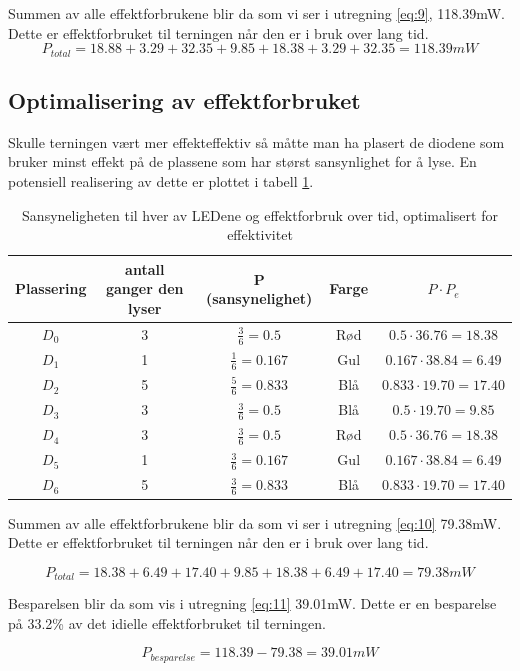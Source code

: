 Summen av alle effektforbrukene blir da som vi ser i utregning \ref{eq:9}, 118.39mW. Dette er effektforbruket til terningen når den er i bruk over lang tid.
\begin{equation}
  P_{total} = 18.88 + 3.29 + 32.35 + 9.85 + 18.38 + 3.29 + 32.35 = 118.39 mW
  \label{eq:9}
\end{equation}



\subsection[Optimalisering]{Optimalisering av effektforbruket}

Skulle terningen vært mer effekteffektiv så måtte man ha plasert de diodene som bruker minst effekt på de plassene som har størst sansynlighet for å lyse. En potensiell realisering av dette er plottet i tabell \ref{table:tab5}.

\begin{table}[!h]
  \centering
  \caption{Sansyneligheten til hver av LEDene og effektforbruk over tid, optimalisert for effektivitet}
  \begin{tabular}[!h]{ |c|c|c|c|c| }
    \hline
    Plassering & antall ganger den lyser & P (sansynelighet) & Farge & $P \cdot P_e $  \\
    \hline
    $D_0$ & 3 & $\frac{3}{6} = 0.5$ & Rød & $0.5 \cdot 36.76 = 18.38$\\
    \hline
    $D_1$ & 1 & $\frac{1}{6} = 0.167$ & Gul & $0.167 \cdot 38.84 = 6.49$\\
    \hline
    $D_2$ & 5 & $\frac{5}{6} = 0.833$ & Blå & $0.833 \cdot 19.70 = 17.40$\\
    \hline
    $D_3$ & 3 & $\frac{3}{6} = 0.5$ & Blå & $0.5 \cdot 19.70 = 9.85$\\
    \hline
    $D_4$ & 3 & $\frac{3}{6} = 0.5$ & Rød & $0.5 \cdot 36.76 = 18.38$\\
    \hline
    $D_5$ & 1 & $\frac{3}{6} = 0.167$ & Gul & $0.167 \cdot 38.84 = 6.49$\\
    \hline
    $D_6$ & 5 & $\frac{3}{6} = 0.833$ & Blå & $0.833 \cdot 19.70 = 17.40$\\
    \hline
  \end{tabular}
  \label{table:tab5}
\end{table}

Summen av alle effektforbrukene blir da som vi ser i utregning \ref{eq:10} 79.38mW. Dette er effektforbruket til terningen når den er i bruk over lang tid.

\begin{equation}
  P_{total} = 18.38 + 6.49 + 17.40 + 9.85 + 18.38 + 6.49 + 17.40 = 79.38 mW
  \label{eq:10}
\end{equation}

Besparelsen blir da som vis i utregning \ref{eq:11} 39.01mW. Dette er en besparelse på 33.2\% av det idielle effektforbruket til terningen.

\begin{equation}
  P_{besparelse} = 118.39 - 79.38 = 39.01 mW
  \label{eq:11}
\end{equation}


